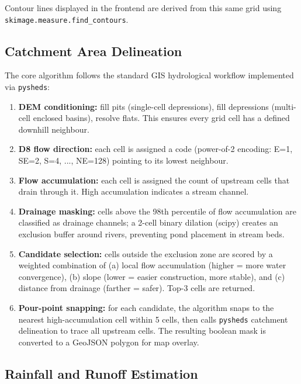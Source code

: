 \documentclass[manuscript,screen,review]{acmart}
\begin{document}
Contour lines displayed in the frontend are derived from this same
grid using \texttt{skimage.measure.find\_contours}.

\subsection{Catchment Area Delineation}

The core algorithm follows the standard GIS hydrological workflow
implemented via \texttt{pysheds}:

\begin{enumerate}
  \item \textbf{DEM conditioning:} fill pits (single-cell depressions),
        fill depressions (multi-cell enclosed basins), resolve flats.
        This ensures every grid cell has a defined downhill neighbour.
  \item \textbf{D8 flow direction:} each cell is assigned a code
        (power-of-2 encoding: E=1, SE=2, S=4, ..., NE=128) pointing to
        its lowest neighbour.
  \item \textbf{Flow accumulation:} each cell is assigned the count of
        upstream cells that drain through it. High accumulation
        indicates a stream channel.
  \item \textbf{Drainage masking:} cells above the 98th percentile of
        flow accumulation are classified as drainage channels; a
        2-cell binary dilation (scipy) creates an exclusion buffer
        around rivers, preventing pond placement in stream beds.
  \item \textbf{Candidate selection:} cells outside the exclusion zone
        are scored by a weighted combination of (a) local flow
        accumulation (higher = more water convergence), (b) slope
        (lower = easier construction, more stable), and (c) distance
        from drainage (farther = safer). Top-3 cells are returned.
  \item \textbf{Pour-point snapping:} for each candidate, the algorithm
        snaps to the nearest high-accumulation cell within 5 cells,
        then calls \texttt{pysheds} catchment delineation to trace all
        upstream cells. The resulting boolean mask is converted to a
        GeoJSON polygon for map overlay.
\end{enumerate}

\subsection{Rainfall and Runoff Estimation}
\end{document}
